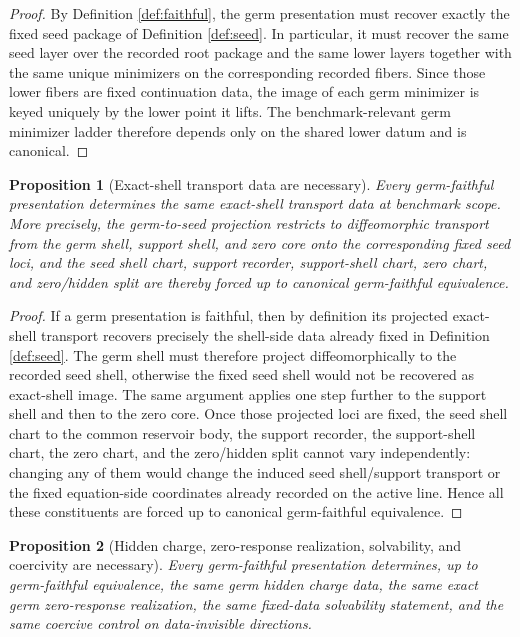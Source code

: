 \documentclass[11pt]{article}
\newtheorem{proposition}{Proposition}
\begin{document}
\begin{proof}
By Definition \ref{def:faithful}, the germ presentation must recover exactly the fixed seed package of Definition \ref{def:seed}. In particular, it must recover the same seed layer over the recorded root package and the same lower layers together with the same unique minimizers on the corresponding recorded fibers. Since those lower fibers are fixed continuation data, the image of each germ minimizer is keyed uniquely by the lower point it lifts. The benchmark-relevant germ minimizer ladder therefore depends only on the shared lower datum and is canonical.
\end{proof}

\begin{proposition}[Exact-shell transport data are necessary]
\label{prop:shell}
Every germ-faithful presentation determines the same exact-shell transport data at benchmark scope. More precisely, the germ-to-seed projection restricts to diffeomorphic transport from the germ shell, support shell, and zero core onto the corresponding fixed seed loci, and the seed shell chart, support recorder, support-shell chart, zero chart, and zero/hidden split are thereby forced up to canonical germ-faithful equivalence.
\end{proposition}

\begin{proof}
If a germ presentation is faithful, then by definition its projected exact-shell transport recovers precisely the shell-side data already fixed in Definition \ref{def:seed}. The germ shell must therefore project diffeomorphically to the recorded seed shell, otherwise the fixed seed shell would not be recovered as exact-shell image. The same argument applies one step further to the support shell and then to the zero core. Once those projected loci are fixed, the seed shell chart to the common reservoir body, the support recorder, the support-shell chart, the zero chart, and the zero/hidden split cannot vary independently: changing any of them would change the induced seed shell/support transport or the fixed equation-side coordinates already recorded on the active line. Hence all these constituents are forced up to canonical germ-faithful equivalence.
\end{proof}

\begin{proposition}[Hidden charge, zero-response realization, solvability, and coercivity are necessary]
\label{prop:hidden}
Every germ-faithful presentation determines, up to germ-faithful equivalence, the same germ hidden charge data, the same exact germ zero-response realization, the same fixed-data solvability statement, and the same coercive control on data-invisible directions.
\end{proposition}
\end{document}
